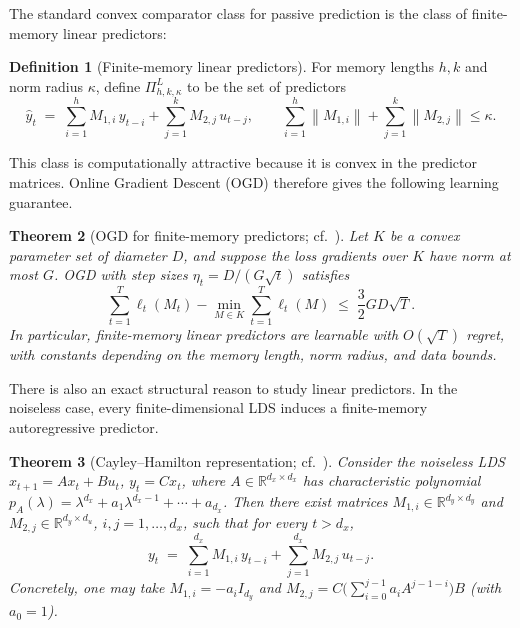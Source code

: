 \documentclass[11pt]{article}
\theoremstyle{plain}
\newtheorem{theorem}{Theorem}[section]
\theoremstyle{definition}
\newtheorem{definition}[theorem]{Definition}
\theoremstyle{remark}
\newcommand{\R}{\mathbb{R}}
\newcommand{\norm}[1]{\left\lVert#1\right\rVert}
\begin{document}
The standard convex comparator class for passive prediction is the class of finite-memory linear predictors:
\begin{definition}[Finite-memory linear predictors]
\label{def:linear-predictors}
For memory lengths $h, k$ and norm radius $\kappa$, define $\Pi^L_{h, k, \kappa}$ to be the set of predictors
\begin{equation}
    \hat y_t \;=\; \sum_{i=1}^{h} M_{1, i} \, y_{t-i} + \sum_{j=1}^{k} M_{2, j} \, u_{t-j},
    \qquad
    \sum_{i=1}^{h} \norm{M_{1, i}} + \sum_{j=1}^{k} \norm{M_{2, j}} \leq \kappa.
    \label{eq:linear-predictor}
\end{equation}
\end{definition}

This class is computationally attractive because it is convex in the predictor matrices. Online Gradient Descent (OGD) therefore gives the following learning guarantee. 

\begin{theorem}[OGD for finite-memory predictors; cf.\ {\citealp[Thm.~6.1 and Cor.~9.7]{hazan2025onlinecontrol}}]
\label{thm:ogd-linear-predictors}
Let $K$ be a convex parameter set of diameter $D$, and suppose the loss gradients over $K$ have norm at most $G$. OGD with step sizes $\eta_t = D / (G \sqrt{t})$ satisfies
\begin{equation}
    \sum_{t=1}^{T} \ell_t(M_t) - \min_{M \in K} \sum_{t=1}^{T} \ell_t(M) \;\leq\; \frac{3}{2} G D \sqrt{T}.
    \label{eq:ogd-regret}
\end{equation}
In particular, finite-memory linear predictors are learnable with $O(\sqrt{T})$ regret, with constants depending on the memory length, norm radius, and data bounds.
\end{theorem}

There is also an exact structural reason to study linear predictors. In the noiseless case, every finite-dimensional LDS induces a finite-memory autoregressive predictor.

\begin{theorem}[Cayley--Hamilton representation; cf.\ {\citealp[Thm.~9.4]{hazan2025onlinecontrol}}]
\label{thm:cayley-hamilton}
Consider the noiseless LDS $x_{t+1} = A x_t + B u_t$, $y_t = C x_t$, where $A \in \R^{d_x \times d_x}$ has characteristic polynomial $p_A(\lambda) = \lambda^{d_x} + a_1 \lambda^{d_x - 1} + \cdots + a_{d_x}$. Then there exist matrices $M_{1, i} \in \R^{d_y \times d_y}$ and $M_{2, j} \in \R^{d_y \times d_u}$, $i, j = 1, \ldots, d_x$, such that for every $t > d_x$,
\begin{equation}
    y_t \;=\; \sum_{i=1}^{d_x} M_{1, i} \, y_{t-i} + \sum_{j=1}^{d_x} M_{2, j} \, u_{t-j}.
    \label{eq:cayley-hamilton-predictor}
\end{equation}
Concretely, one may take $M_{1, i} = -a_i I_{d_y}$ and $M_{2, j} = C\bigl(\sum_{i=0}^{j-1} a_i A^{j-1-i}\bigr) B$ (with $a_0 = 1$).
\end{theorem}
\end{document}
